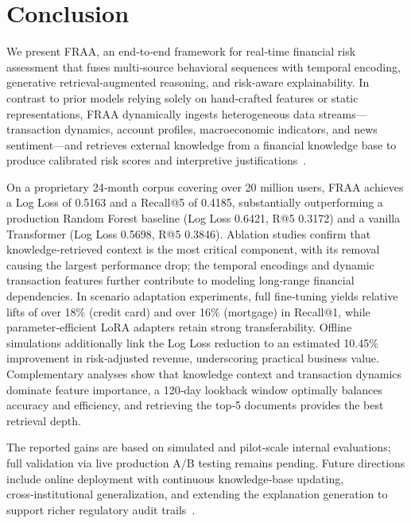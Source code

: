\documentclass[10pt,twocolumn]{article}
\begin{document}
\section{Conclusion}

We present FRAA, an end‑to‑end framework for real‑time financial risk assessment that fuses multi‑source behavioral sequences with temporal encoding, generative retrieval‑augmented reasoning, and risk‑aware explainability. In contrast to prior models relying solely on hand‑crafted features or static representations, FRAA dynamically ingests heterogeneous data streams—transaction dynamics, account profiles, macroeconomic indicators, and news sentiment—and retrieves external knowledge from a financial knowledge base to produce calibrated risk scores and interpretive justifications~\cite{arxiv-2510.22095,arxiv-2512.12586,arxiv-2511.12662}.

On a proprietary 24‑month corpus covering over 20 million users, FRAA achieves a Log Loss of 0.5163 and a Recall@5 of 0.4185, substantially outperforming a production Random Forest baseline (Log Loss 0.6421, R@5 0.3172) and a vanilla Transformer (Log Loss 0.5698, R@5 0.3846). Ablation studies confirm that knowledge‑retrieved context is the most critical component, with its removal causing the largest performance drop; the temporal encodings and dynamic transaction features further contribute to modeling long‑range financial dependencies. In scenario adaptation experiments, full fine‑tuning yields relative lifts of over 18\% (credit card) and over 16\% (mortgage) in Recall@1, while parameter‑efficient LoRA adapters retain strong transferability. Offline simulations additionally link the Log Loss reduction to an estimated 10.45\% improvement in risk‑adjusted revenue, underscoring practical business value. Complementary analyses show that knowledge context and transaction dynamics dominate feature importance, a 120‑day lookback window optimally balances accuracy and efficiency, and retrieving the top‑5 documents provides the best retrieval depth.

The reported gains are based on simulated and pilot‑scale internal evaluations; full validation via live production A/B testing remains pending. Future directions include online deployment with continuous knowledge‑base updating, cross‑institutional generalization, and extending the explanation generation to support richer regulatory audit trails~\cite{arxiv-2511.14650,arxiv-2512.03874,arxiv-2512.05494}.


\end{document}
